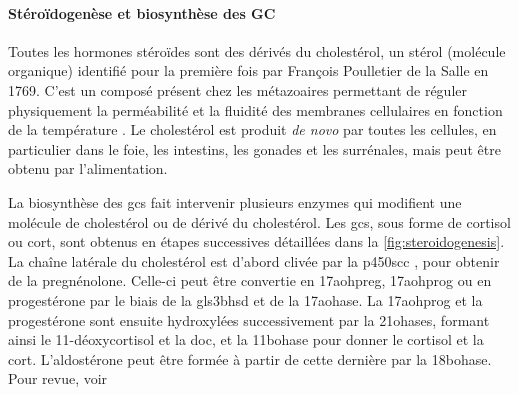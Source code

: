 \documentclass[../main.tex]{subfiles}
\begin{document}
\paragraph{Stéroïdogenèse et biosynthèse des GC}
Toutes les hormones stéroïdes sont des dérivés du cholestérol, un stérol (molécule organique) identifié pour la première fois par François Poulletier de la Salle en 1769.
C'est un composé présent chez les métazoaires permettant de réguler physiquement la perméabilité et la fluidité des membranes cellulaires en fonction de la température \citep{Cooper1978}.
Le cholestérol est produit \textit{de novo} par toutes les cellules, en particulier dans le foie, les intestins, les gonades et les surrénales, mais peut être obtenu par l'alimentation.
\par
%
%

La biosynthèse des \glspl{gc} fait intervenir plusieurs enzymes qui modifient une molécule de cholestérol ou de dérivé du cholestérol.
Les \glspl{gc}, sous forme de cortisol ou \gls{cort}, sont obtenus en étapes successives détaillées dans la \autoref{fig:steroidogenesis}.
La chaîne latérale du cholestérol est d'abord clivée par la \gls{p450scc} \citep{Chung1986}, pour obtenir de la pregnénolone.
Celle-ci peut être convertie en \gls{17aohpreg}, \gls{17aohprog} ou en progestérone par le biais de la gls{3bhsd} et de la \gls{17aohase}.
La \gls{17aohprog} et la progestérone sont ensuite hydroxylées successivement par la \glspl{21ohase}, formant ainsi le 11-déoxycortisol et la \gls{doc}, et la \gls{11bohase} pour donner le cortisol et la \gls{cort}.
L'aldostérone peut être formée à partir de cette dernière par la \gls{18bohase}.
Pour revue, voir \citep{Ghayee2007}


\end{document}
